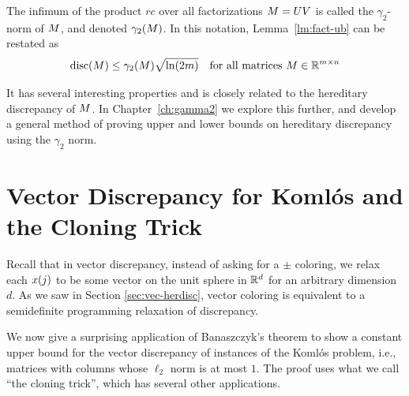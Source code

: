 \medskip
{}
The infimum of the product $rc$ over all factorizations $M = UV$ is
called the $\gamma_2$-norm of $M$, and denoted
$\gamma_2(M)$. In this notation, Lemma~\ref{lm:fact-ub} can be
restated as
\begin{equation}
  \label{eq:fact-ub}
  \operatorname{disc}(M) \le \gamma_2(M)  \sqrt{\ln(2m)}
  \quad \text{for all matrices $M \in \mathbb{R}^{m\times n}$}
\end{equation}

It has several interesting
properties and is closely related to the hereditary discrepancy of
$M$. In Chapter~\ref{ch:gamma2} we explore this further, and
develop a general method of proving upper and lower bounds on
hereditary discrepancy using the $\gamma_2$ norm.


\section{Vector Discrepancy for Koml\'os and the Cloning Trick}
\label{sec:komlos-sdp-bound}




Recall that in vector discrepancy,
instead of asking for a $\pm$
coloring,
we relax each $x(j)$ to be some vector on the unit sphere in
$\mathbb{R}^d$ for an arbitrary dimension $d$. As we saw in Section \ref{sec:vec-herdisc}, vector coloring is
equivalent to a semidefinite programming relaxation of discrepancy.

We now give a surprising application of Banaszczyk's theorem to show a constant upper bound for the vector discrepancy of instances of the Koml\'os problem, i.e., matrices with columns whose $\ell_2$ norm is at most $1$.
The proof uses what we call ``the cloning trick'', which has several
other applications.

